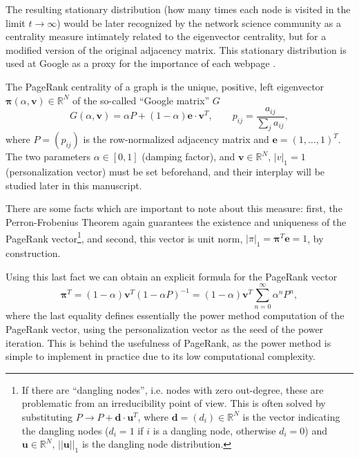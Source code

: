 \documentclass[sn-mathphys-ay]{sn-jnl}%
\newcommand{\R}{\mathbb{R}}
\newcommand{\bv}{\bm{v}}
\newcommand{\be}{\mathbf{e}}
\theoremstyle{thmstyleone}%
\theoremstyle{thmstyletwo}%
\theoremstyle{thmstylethree}%
\begin{document}
The resulting stationary distribution (how many times each node is visited in the limit $t\rightarrow\infty$) would be later recognized by the network science community as a centrality measure intimately related to the eigenvector centrality, but for a modified version of the original adjacency matrix. This stationary distribution is used at Google as a proxy for the importance of each webpage \cite{page1998pagerank}. 

The PageRank centrality of a graph is the unique, positive, left eigenvector $\bm{\pi}(\alpha,\bm{v})\in\R^N$ of the so-called ``Google matrix'' $G$
\begin{equation}\label{eq:PageRank}
	G(\alpha,\bv) = \alpha P + (1-\alpha) \be \cdot \bv^T, \qquad p_{ij}=\frac{a_{ij}}{\sum_j a_{ij}},
\end{equation}
where $P=(p_{ij})$ is the row-normalized adjacency matrix and $\be=(1,\dots,1)^T$. The two parameters $\alpha\in[0,1]$ (damping factor), and $\bv\in\R^N,\, |v|_1=1$ (personalization vector) must be set beforehand, and their interplay will be studied later in this manuscript. 


There are some facts which are important to note about this measure: first, the Perron-Frobenius Theorem \cite{perron1907theorie} again guarantees the existence and uniqueness of the PageRank vector\footnote{If there are ``dangling nodes'', i.e. nodes with zero out-degree, these are problematic from an irreducibility point of view. This is often solved by substituting $P\rightarrow P + \mathbf{d} \cdot \bm{u}^T$, where $\bm{d}=(d_i)\in\R^N$ is the vector indicating the dangling nodes ($d_i=1$ if $i$ is a dangling node, otherwise $d_i = 0$) and $\bm{u}\in\R^N,\,||\bm{u}||_1$ is the dangling node distribution.}, and second, this vector is unit norm, $|\pi|_1 =\bm{\pi}^T \be = 1$, by construction.

Using this last fact we can obtain an explicit formula for the PageRank vector \cite{boldi2005pagerank}
\begin{equation}\label{eq:PRexplicit}
	\bm{\pi}^T = (1-\alpha)\bv^T(1-\alpha P)^{-1}= (1-\alpha)\bv^T \sum_{n=0}^\infty \alpha^n P^n,
\end{equation}
where the last equality defines essentially the power method computation of the PageRank vector, using the personalization vector as the seed of the power iteration. This is behind the usefulness of PageRank, as the power method is simple to implement in practice due to its low computational complexity.
\end{document}
